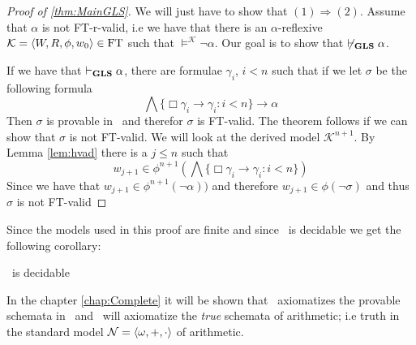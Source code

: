 \documentclass[../main.tex]{subfiles}
\begin{document}
\begin{proof}[Proof of \ref{thm:MainGLS}]
	We will just have to show that $(1)\Rightarrow (2)$.
	Assume that $\alpha$ is not FT-r-valid, i.e we have that there is an
	$\alpha$-reflexive $\mathcal{K}=\langle W,R,\phi,w_0\rangle\in\text{FT}$ such
	that $\vDash^\mathcal{K}\neg\alpha$. Our goal is to show that
	$\not\vdash_{\text{\textbf{GLS}}}\alpha$.

	If we have that $\vdash_{\text{\textbf{GLS}}}\alpha$, there are formulae $\gamma_i$,
	$i<n$ such that if we let $\sigma$ be the following formula
	\[\bigwedge\{\Box\gamma_i\rightarrow\gamma_i:i<n\}\rightarrow\alpha\]
	Then $\sigma$ is provable in \GL\ and therefor $\sigma$ is FT-valid. The theorem
	follows if we can show that $\sigma$ is not FT-valid. We will look at
	the derived model $\mathcal{K}^{n+1}$. By Lemma \ref{lem:hvad} there is a
	$j\leq n$ such that
	\[w_{j+1}\in\phi^{n+1}(\bigwedge\{\Box\gamma_i\rightarrow\gamma_i:i<n\})\]
	Since we have that $w_{j+1}\in\phi^{n+1}(\neg\alpha))$ and therefore
	$w_{j+1}\in\phi(\neg\sigma)$ and thus $\sigma$ is not FT-valid
\end{proof}
Since the models used in this proof are finite and since \GL\ is decidable we get the following corollary:
\begin{cor}
	\GLS\ is decidable 
\end{cor}
In the chapter \ref{chap:Complete} it will be shown that \GL\ axiomatizes the
provable schemata in \PRA\ and \GLS\ will axiomatize the \textit{true} schemata
of arithmetic; i.e truth in the standard model $\mathcal{N}=\langle
\omega,+,\cdot\rangle$ of arithmetic.
\end{document}
